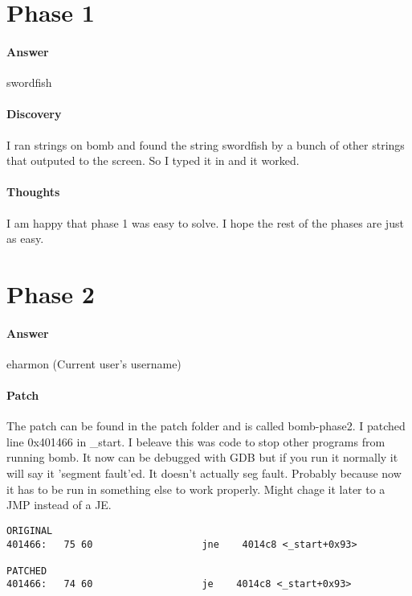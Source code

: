 \documentclass[12pt]{article}
\begin{document}
\maketitle

\section{Phase 1}
\paragraph{Answer}
swordfish

\paragraph{Discovery}
I ran strings on bomb and found the string swordfish by a bunch of other strings that outputed to the screen. So I typed it in and it worked.

\paragraph{Thoughts}
I am happy that phase 1 was easy to solve. I hope the rest of the phases are just as easy.

\section{Phase 2}
\paragraph{Answer}
eharmon (Current user's username)

\paragraph{Patch}
The patch can be found in the patch folder and is called bomb-phase2. I patched line 0x401466 in \_start. I beleave this was code to stop other programs from running bomb. It now can be debugged with GDB but if you run it normally it will say it 'segment fault'ed. It doesn't actually seg fault. Probably because now it has to be run in something else to work properly. Might chage it later to a JMP instead of a JE.

\begin{verbatim}
ORIGINAL
401466:   75 60                   jne    4014c8 <_start+0x93>

PATCHED
401466:   74 60                   je    4014c8 <_start+0x93>
\end{verbatim}
\end{document}
